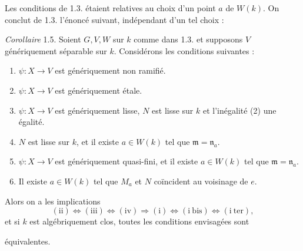 \documentclass[11pt,a4paper]{article}
\begin{document}
Les conditions de 1.3. étaient relatives au choix d'un point $a$ de $W(k)$.
On conclut de 1.3. l'énoncé suivant, indépendant d'un tel choix :

\emph{Corollaire} 1.5. Soient $G, V, W$ sur $k$ comme dans 1.3.
 et supposons $V$ génériquement  séparable sur $k$. Considérons les conditions suivantes :

\begin{enumerate}
  \item[(i)] \struck{\ill{}} $\psi : X \to V$ est génériquement non ramifié.
  \item[(i bis)] $\psi : X \to V$ est génériquement étale.
  \item[(i ter)] $\psi : X \to V$ est génériquement lisse, $N$ est lisse sur
  $k$ et l'inégalité (2) une égalité.
  \item[(ii)]  $N$ est lisse sur $k$,
  et il existe $a \in W(k)$ tel que $\mathfrak{m} = \mathfrak{n}_a$.
  \item[(iii)] $\psi : X \to V$ est génériquement quasi-fini, et il existe
  $a \in W(k)$ tel que $\mathfrak{m} = \mathfrak{n}_a$.
  \item[(iv)] Il existe $a \in W(k)$ tel que $M_a$ et $N$ coïncident au
  voisinage de $e$.
\end{enumerate}

Alors on a les implications
\[
  (\mathrm{ii}) \Leftrightarrow (\mathrm{iii}) \Leftrightarrow (\mathrm{iv})
  \Longrightarrow (\mathrm{i}) \Leftrightarrow (\mathrm{i\ bis})
  \Leftrightarrow (\mathrm{i\ ter}) ,
\]
et si $k$ est algébriquement clos, toutes les conditions envisagées sont



équivalentes.
\end{document}
